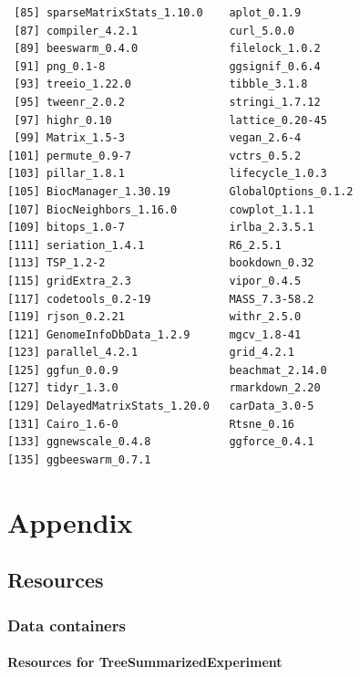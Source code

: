 \documentclass[
]{book}
\begin{document}
\begin{verbatim}
 [85] sparseMatrixStats_1.10.0    aplot_0.1.9                
 [87] compiler_4.2.1              curl_5.0.0                 
 [89] beeswarm_0.4.0              filelock_1.0.2             
 [91] png_0.1-8                   ggsignif_0.6.4             
 [93] treeio_1.22.0               tibble_3.1.8               
 [95] tweenr_2.0.2                stringi_1.7.12             
 [97] highr_0.10                  lattice_0.20-45            
 [99] Matrix_1.5-3                vegan_2.6-4                
[101] permute_0.9-7               vctrs_0.5.2                
[103] pillar_1.8.1                lifecycle_1.0.3            
[105] BiocManager_1.30.19         GlobalOptions_0.1.2        
[107] BiocNeighbors_1.16.0        cowplot_1.1.1              
[109] bitops_1.0-7                irlba_2.3.5.1              
[111] seriation_1.4.1             R6_2.5.1                   
[113] TSP_1.2-2                   bookdown_0.32              
[115] gridExtra_2.3               vipor_0.4.5                
[117] codetools_0.2-19            MASS_7.3-58.2              
[119] rjson_0.2.21                withr_2.5.0                
[121] GenomeInfoDbData_1.2.9      mgcv_1.8-41                
[123] parallel_4.2.1              grid_4.2.1                 
[125] ggfun_0.0.9                 beachmat_2.14.0            
[127] tidyr_1.3.0                 rmarkdown_2.20             
[129] DelayedMatrixStats_1.20.0   carData_3.0-5              
[131] Cairo_1.6-0                 Rtsne_0.16                 
[133] ggnewscale_0.4.8            ggforce_0.4.1              
[135] ggbeeswarm_0.7.1           
\end{verbatim}

\hypertarget{part-appendix}{%
\part{Appendix}\label{part-appendix}}

\hypertarget{resources}{%
\chapter{Resources}\label{resources}}

\hypertarget{data-containers-1}{%
\section{Data containers}\label{data-containers-1}}

\hypertarget{resources-for-treesummarizedexperiment}{%
\subsection{Resources for TreeSummarizedExperiment}\label{resources-for-treesummarizedexperiment}}
\end{document}
